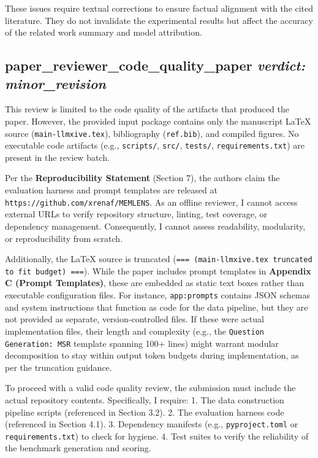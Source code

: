 \documentclass{llmxive}
\begin{document}
These issues require textual corrections to ensure factual alignment with the cited literature. They do not invalidate the experimental results but affect the accuracy of the related work summary and model attribution.

\bigskip

\subsection*{paper\_reviewer\_code\_quality\_paper \hfill \textit{verdict: minor\_revision}}
This review is limited to the code quality of the artifacts that produced the paper. However, the provided input package contains only the manuscript LaTeX source (\texttt{main-llmxive.tex}), bibliography (\texttt{ref.bib}), and compiled figures. No executable code artifacts (e.g., \texttt{scripts/}, \texttt{src/}, \texttt{tests/}, \texttt{requirements.txt}) are present in the review batch.

Per the \textbf{Reproducibility Statement} (Section 7), the authors claim the evaluation harness and prompt templates are released at \texttt{https://github.com/xrenaf/MEMLENS}. As an offline reviewer, I cannot access external URLs to verify repository structure, linting, test coverage, or dependency management. Consequently, I cannot assess readability, modularity, or reproducibility from scratch.

Additionally, the LaTeX source is truncated (\texttt{=== (main-llmxive.tex truncated to fit budget) ===}). While the paper includes prompt templates in \textbf{Appendix C (Prompt Templates)}, these are embedded as static text boxes rather than executable configuration files. For instance, \texttt{app:prompts} contains JSON schemas and system instructions that function as code for the data pipeline, but they are not provided as separate, version-controlled files. If these were actual implementation files, their length and complexity (e.g., the \texttt{Question Generation: MSR} template spanning 100+ lines) might warrant modular decomposition to stay within output token budgets during implementation, as per the truncation guidance.

To proceed with a valid code quality review, the submission must include the actual repository contents. Specifically, I require:
1.  The data construction pipeline scripts (referenced in Section 3.2).
2.  The evaluation harness code (referenced in Section 4.1).
3.  Dependency manifests (e.g., \texttt{pyproject.toml} or \texttt{requirements.txt}) to check for hygiene.
4.  Test suites to verify the reliability of the benchmark generation and scoring.
\end{document}
